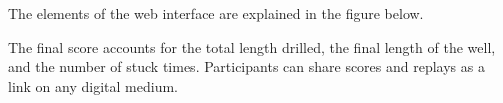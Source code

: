 
The elements of the web interface are explained in the figure below.




The final score accounts for the total length drilled, the final length of the well, and the number of stuck times. 
Participants can share scores and replays  as a link on any digital medium.